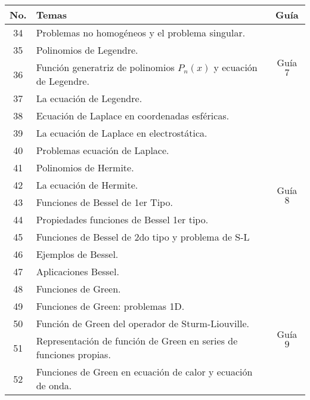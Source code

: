 \begin{table}[H]
	\centering
	\begin{tabular}{||c|p{13cm}||c||}
		\hline
		\hline
			No. & Temas & Guía \\
		\hline
		\hline
			34 & Problemas no homogéneos y el problema singular. & \multirow{4}{2cm}{Guía $7$} \\
			35 & Polinomios de Legendre. & \\
			36 & Función generatriz de polinomios $P_n (x)$ y ecuación de Legendre. & \\
			37 & La ecuación de Legendre. & \\
		\hline
			38 & Ecuación de Laplace en coordenadas esféricas. & \multirow{10}{2cm}{Guía $8$} \\
			39 & La ecuación de Laplace en electrostática. & \\
			40 & Problemas ecuación de Laplace. & \\
			41 & Polinomios de Hermite. & \\
			42 & La ecuación de Hermite. & \\
			43 & Funciones de Bessel de 1er Tipo. & \\
			44 & Propiedades funciones de Bessel 1er tipo. & \\
			45 & Funciones de Bessel de 2do tipo y problema de S-L & \\
			46 & Ejemplos de Bessel. &  \\
			47 & Aplicaciones Bessel. &  \\
		\hline
			48 & Funciones de Green. & \multirow{5}{2cm}{Guía $9$} \\
			49 & Funciones de Green: problemas 1D. &  \\
			50 & Función de Green del operador de Sturm-Liouville. &  \\
			51 & Representación de función de Green en series de funciones propias. &  \\
			52 & Funciones de Green en ecuación de calor y ecuación de onda. &  \\
		\hline
		\hline
	\end{tabular}
\end{table}





